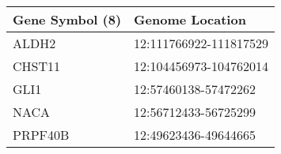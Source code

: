 \begin{tabular}{ll}
\toprule
Gene Symbol (8) &        Genome Location \\
\midrule
          ALDH2 & 12:111766922-111817529 \\
         CHST11 & 12:104456973-104762014 \\
           GLI1 &   12:57460138-57472262 \\
           NACA &   12:56712433-56725299 \\
        PRPF40B &   12:49623436-49644665 \\
\bottomrule
\end{tabular}

